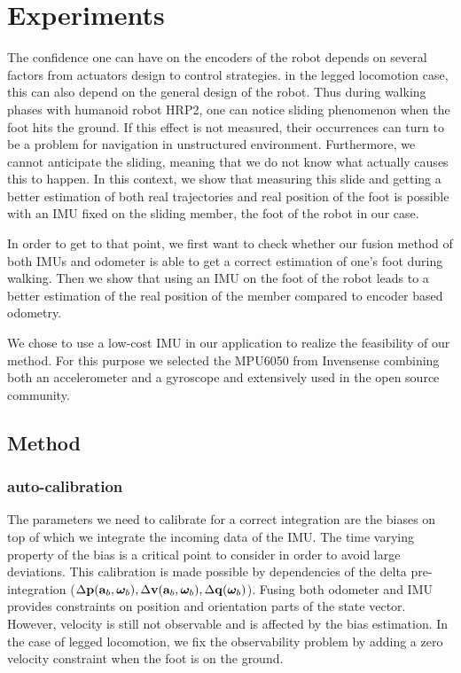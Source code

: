 
\section{Experiments} \label{sec:experiments}

The confidence one can have on the encoders of the robot depends on several factors from actuators design to control strategies. in the legged locomotion case, this can also depend on the general design of the robot.
Thus during walking phases with humanoid robot HRP2, one can notice sliding phenomenon when the foot hits the ground. If this effect is not measured, their occurrences can turn to be a problem for navigation in unstructured environment. 
Furthermore, we cannot anticipate the sliding, meaning that we do not know what actually causes this to happen. 
In this context, we show that measuring this slide and getting a better estimation of both real trajectories and real position of the foot is possible with an IMU fixed on the sliding member, the foot of the robot in our case.

In order to get to that point, we first want to check whether our fusion method of both IMUs and odometer is able to get a correct estimation of one's foot during walking.
Then we show that using an IMU on the foot of the robot leads to a better estimation of the real position of the member compared to encoder based odometry.

We chose to use a low-cost IMU in our application to realize the feasibility of our method. For this purpose we selected the 
MPU6050 from Invensense combining both an accelerometer and a gyroscope and extensively used in the open source community.



\subsection{Method}
\subsubsection{auto-calibration}

The parameters we need to calibrate for a correct integration are the biases on top of which we integrate the incoming data of the IMU.
The time varying property of the bias is a critical point to consider in order to avoid large deviations. This calibration is made possible
by dependencies of the delta pre-integration (${{\Delta{\bf p}}}({\bf a}_b, {{\bm \omega}}_b), {{\Delta{\bf v}}}({\bf a}_b, {{\bm \omega}}_b), {{\Delta{\bf q}}}({{\bm \omega}}_b)$). Fusing both odometer and IMU provides constraints on position and orientation parts of
the state vector. However, velocity is still not observable and is affected by the bias estimation. In the case of legged locomotion, we fix the observability problem by adding a zero velocity constraint when the foot is on the ground.

